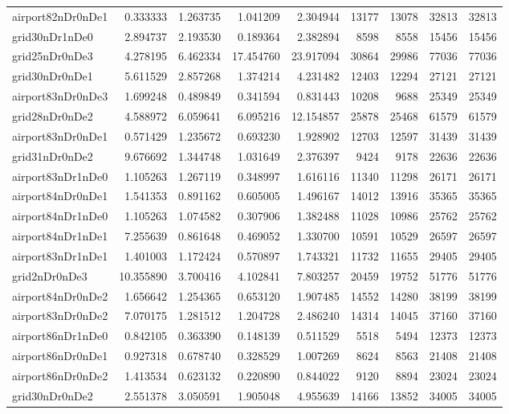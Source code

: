 \begin{longtable}{|l|r|r|r|r|r|r|r|r|}
airport82nDr0nDe1 & 0.333333 & 1.263735 & 1.041209 & 2.304944 & 13177 & 13078 & 32813 & 32813 \\
grid30nDr1nDe0 & 2.894737 & 2.193530 & 0.189364 & 2.382894 & 8598 & 8558 & 15456 & 15456 \\
grid25nDr0nDe3 & 4.278195 & 6.462334 & 17.454760 & 23.917094 & 30864 & 29986 & 77036 & 77036 \\
grid30nDr0nDe1 & 5.611529 & 2.857268 & 1.374214 & 4.231482 & 12403 & 12294 & 27121 & 27121 \\
airport83nDr0nDe3 & 1.699248 & 0.489849 & 0.341594 & 0.831443 & 10208 & 9688 & 25349 & 25349 \\
grid28nDr0nDe2 & 4.588972 & 6.059641 & 6.095216 & 12.154857 & 25878 & 25468 & 61579 & 61579 \\
airport83nDr0nDe1 & 0.571429 & 1.235672 & 0.693230 & 1.928902 & 12703 & 12597 & 31439 & 31439 \\
grid31nDr0nDe2 & 9.676692 & 1.344748 & 1.031649 & 2.376397 & 9424 & 9178 & 22636 & 22636 \\
airport83nDr1nDe0 & 1.105263 & 1.267119 & 0.348997 & 1.616116 & 11340 & 11298 & 26171 & 26171 \\
airport84nDr0nDe1 & 1.541353 & 0.891162 & 0.605005 & 1.496167 & 14012 & 13916 & 35365 & 35365 \\
airport84nDr1nDe0 & 1.105263 & 1.074582 & 0.307906 & 1.382488 & 11028 & 10986 & 25762 & 25762 \\
airport84nDr1nDe1 & 7.255639 & 0.861648 & 0.469052 & 1.330700 & 10591 & 10529 & 26597 & 26597 \\
airport83nDr1nDe1 & 1.401003 & 1.172424 & 0.570897 & 1.743321 & 11732 & 11655 & 29405 & 29405 \\
grid2nDr0nDe3 & 10.355890 & 3.700416 & 4.102841 & 7.803257 & 20459 & 19752 & 51776 & 51776 \\
airport84nDr0nDe2 & 1.656642 & 1.254365 & 0.653120 & 1.907485 & 14552 & 14280 & 38199 & 38199 \\
airport83nDr0nDe2 & 7.070175 & 1.281512 & 1.204728 & 2.486240 & 14314 & 14045 & 37160 & 37160 \\
airport86nDr1nDe0 & 0.842105 & 0.363390 & 0.148139 & 0.511529 & 5518 & 5494 & 12373 & 12373 \\
airport86nDr0nDe1 & 0.927318 & 0.678740 & 0.328529 & 1.007269 & 8624 & 8563 & 21408 & 21408 \\
airport86nDr0nDe2 & 1.413534 & 0.623132 & 0.220890 & 0.844022 & 9120 & 8894 & 23024 & 23024 \\
grid30nDr0nDe2 & 2.551378 & 3.050591 & 1.905048 & 4.955639 & 14166 & 13852 & 34005 & 34005 \\

\end{longtable}
